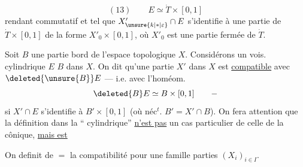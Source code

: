 \[
(13)\qquad E\simeq\dot T\times[0,1]
\]
rendant commutatif
et tel que $X'_{\unsure{k|*|\varepsilon}}\cap E$ s'identifie à une partie
de $\dot T\times[0,1]$ de la forme $X'_0\times[0,1]$, où $X'_0$
est une partie fermée de $\dot T$.

Soit $B$ une partie bord  de l'espace
topologique $X$. Considérons un vois.
cylindrique $E$  $B$ dans $X$. On
dit qu'une partie  $X'$ dans $X$ est \uline{compatible}
avec $\deleted{\unsure{B}}E$ --- i.e. avec l'homéom.
\[
\deleted{B}E\simeq B\times[0,1]\qquad -
\]
si $X'\cap E$ s'identifie à $B'\times[0,1]$
(où néc$^t$.  $B'=X'\cap B$).
On fera attention que la définition dans la
``
 cylindrique'' \uline{n'est pas} un cas
particulier de celle de la 
cônique, \uline{mais est}

On definit de $=$ la compatibilité pour
une famille   parties $(X_i)_{i\in I}$.
